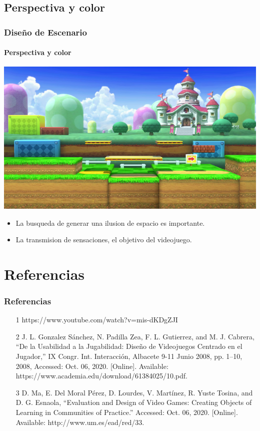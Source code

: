 \documentclass[11pt]{beamer}
\begin{document}
\subsection{Perspectiva y color}
\begin{frame}

\frametitle{Diseño de Escenario}
\framesubtitle{Perspectiva y color}
\begin{center}


 \includegraphics[scale=0.4,keepaspectratio=true]{img/ima2.png}
\end{center}
	\begin{itemize}
	\item La busqueda de generar una ilusion de espacio es importante.
	\item La transmision de sensaciones, el objetivo del videojuego.
	\end{itemize}
\end{frame}

\section{Referencias}
\begin{frame}
\frametitle{Referencias}
\begin{itemize}
\item [1] https://www.youtube.com/watch?v=mis-dKDgZJI

\item [2] J. L. Gonzalez Sánchez, N. Padilla Zea, F. L. Gutierrez, and M. J. Cabrera, “De la Usabilidad a la Jugabilidad: Diseño de Videojuegos Centrado en el Jugador,” IX Congr. Int. Interacción, Albacete 9-11 Junio 2008, pp. 1–10, 2008, Accessed: Oct. 06, 2020. [Online]. Available: https://www.academia.edu/download/61384025/10.pdf.

\item [3] D. Ma, E. Del Moral Pérez, D. Lourdes, V. Martínez, R. Yuste Tosina, and D. G. Esnaola, “Evaluation and Design of Video Games: Creating Objects of Learning in Communities of Practice.” Accessed: Oct. 06, 2020. [Online]. Available: http://www.um.es/ead/red/33.


\end{itemize}
\end{frame}
\end{document}
